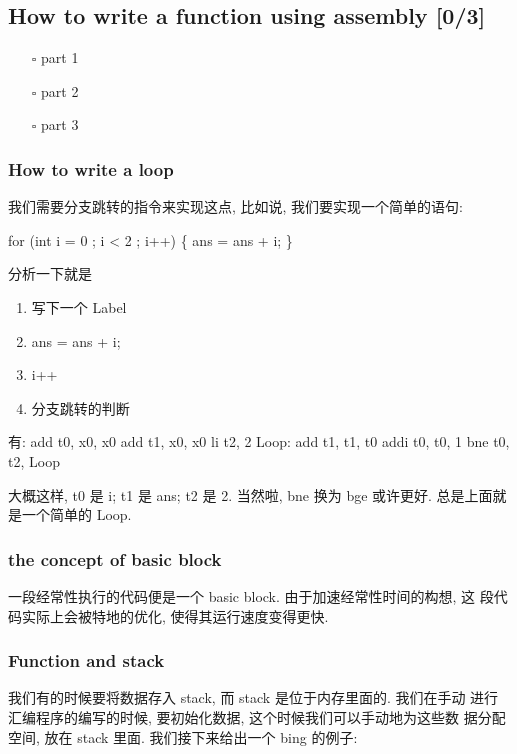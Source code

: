 \documentclass[11pt]{article}
\begin{document}
\subsection{How to write a function using assembly [0/3]}
\label{sec:org33bb453}
\begin{itemize}
\item[{$\square$}] part 1
\item[{$\square$}] part 2
\item[{$\square$}] part 3
\end{itemize}
\subsubsection{How to write a loop}
\label{sec:org640f597}

我们需要分支跳转的指令来实现这点, 比如说, 我们要实现一个简单的语句: 

for (int i = 0 ; i < 2 ; i++) \{
    ans = ans + i;
\}                 

分析一下就是
\begin{enumerate}
\item 写下一个 Label
\item ans = ans + i;
\item i++
\item 分支跳转的判断
\end{enumerate}

有: 
    add t0, x0, x0
    add t1, x0, x0
    li  t2, 2
Loop:
    add t1, t1, t0
    addi t0, t0, 1
    bne t0, t2, Loop

大概这样, t0 是 i; t1 是 ans; t2 是 2. 当然啦, bne 换为 bge 或许更好.
总是上面就是一个简单的 Loop. 

\subsubsection{the concept of basic block}
\label{sec:orgd921fc7}

一段经常性执行的代码便是一个 basic block. 由于加速经常性时间的构想, 这
段代码实际上会被特地的优化, 使得其运行速度变得更快. 

\subsubsection{Function and stack}
\label{sec:orga3b4667}

我们有的时候要将数据存入 stack, 而 stack 是位于内存里面的. 我们在手动
进行汇编程序的编写的时候, 要初始化数据, 这个时候我们可以手动地为这些数
据分配空间, 放在 stack 里面. 我们接下来给出一个 bing 的例子:
\end{document}
